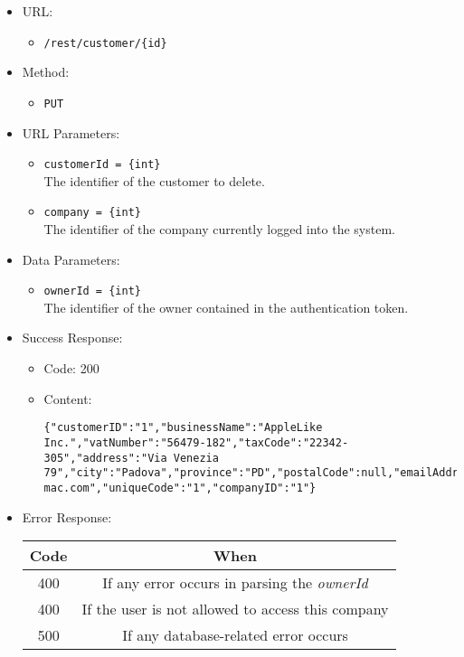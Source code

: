 \begin{itemize}
    
    \item URL: 
    \begin{itemize}
        \item \texttt{/rest/customer/\{id\}}
    \end{itemize}
    
    \item Method: 
    \begin{itemize}
        \item \texttt{PUT}
    \end{itemize}
    
    \item URL Parameters: 
    \begin{itemize}
        \item \texttt{customerId = \{int\}} \\
        The identifier of the customer to delete.
        \item \texttt{company = \{int\}} \\
        The identifier of the company currently logged into the system.
    \end{itemize}
    
    \item Data Parameters: 
    \begin{itemize}
        \item \texttt{ownerId = \{int\}} \\
        The identifier of the owner contained in the authentication token.
    \end{itemize}
    
    \item Success Response: 
    \begin{itemize}
        \item Code: 200
        \item Content:
        \begin{lstlisting}
{"customerID":"1","businessName":"AppleLike Inc.","vatNumber":"56479-182","taxCode":"22342-305","address":"Via Venezia 79","city":"Padova","province":"PD","postalCode":null,"emailAddress":"applelike@google.com","pec":"applelike@pec-mac.com","uniqueCode":"1","companyID":"1"}
        \end{lstlisting}    
    \end{itemize}
    
    \item Error Response:
    \begin{table}[!h]
    \centering 
    \begin{tabular}{|c|c|}
    \hline
    \multicolumn{1}{|c|}{\textbf{Code}} & \multicolumn{1}{c|}{\textbf{When}} \\ \hline
    400 & If any error occurs in parsing the \textit{ownerId}  \\\hline
    400 & If the user is not allowed to access this company \\\hline
    500 & If any database-related error occurs \\\hline
    \end{tabular} 
    \end{table} 
    

\end{itemize}
